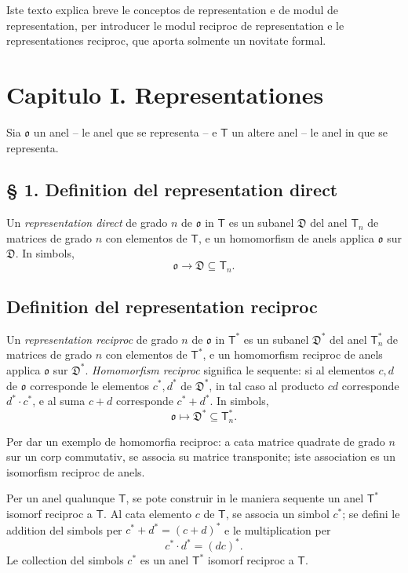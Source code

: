 \documentclass[11pt]{article}
\begin{document}
Iste texto explica breve le conceptos de representation e de modul de representation, per introducer le modul reciproc de representation e le representationes reciproc, que aporta solmente un novitate formal.

\section*{Capitulo I. Representationes}

Sia $\mathfrak{o}$ un anel -- le anel que se representa -- e $\mathsf T$ un altere anel -- le anel in que se representa.

\subsection*{§ 1. Definition del representation direct}

Un \emph{representation direct} de grado $n$ de $\mathfrak{o}$ in $\mathsf T$ es un subanel $\mathfrak D$ del anel $\mathsf T_n$ de matrices de grado $n$ con elementos de $\mathsf T$, e un homomorfism de anels applica $\mathfrak{o}$ sur $\mathfrak D$. In simbols,
\[
\mathfrak{o}\to\mathfrak D\subseteq\mathsf T_n.
\]

\subsection*{Definition del representation reciproc}

Un \emph{representation reciproc} de grado $n$ de $\mathfrak{o}$ in $\mathsf T^*$ es un subanel $\mathfrak D^*$ del anel $\mathsf T_n^*$ de matrices de grado $n$ con elementos de $\mathsf T^*$, e un homomorfism reciproc de anels applica $\mathfrak{o}$ sur $\mathfrak D^*$.
\emph{Homomorfism reciproc} significa le sequente: si al elementos $c,d$ de $\mathfrak{o}$ corresponde le elementos $c^*,d^*$ de $\mathfrak D^*$, in tal caso al producto $cd$ corresponde $d^*\!\cdot c^*$, e al suma $c+d$ corresponde $c^*+d^*$. In simbols,
\[
\mathfrak{o}\mapsto\mathfrak D^*\subseteq\mathsf T_n^*.
\]

Per dar un exemplo de homomorfia reciproc: a cata matrice quadrate de grado $n$ sur un corp commutativ, se associa su matrice transponite; iste association es un isomorfism reciproc de anels.

Per un anel qualunque $\mathsf T$, se pote construir in le maniera sequente un anel $\mathsf T^*$ isomorf reciproc a $\mathsf T$.
Al cata elemento $c$ de $\mathsf T$, se associa un simbol $c^*$; se defini le addition del simbols per $c^*+d^*=(c+d)^*$ e le multiplication per
\[
c^*\!\cdot d^*=(dc)^*.
\]
Le collection del simbols $c^*$ es un anel $\mathsf T^*$ isomorf reciproc a $\mathsf T$.
\end{document}
